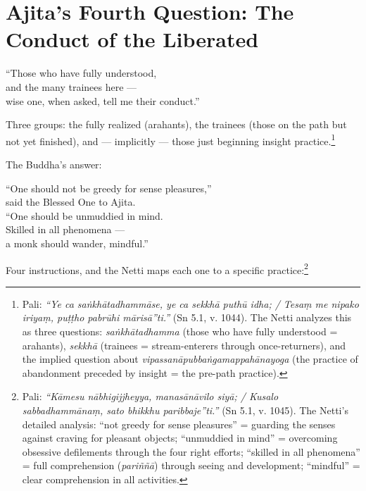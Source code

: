 \section*{Ajita's Fourth Question: The Conduct of the Liberated}

\begin{versebox}
``Those who have fully understood,\\
and the many trainees here ---\\
wise one, when asked, tell me their conduct.''
\end{versebox}

Three groups: the fully realized (arahants), the trainees (those on the path but not yet finished), and --- implicitly --- those just beginning insight practice.\footnote{Pali: \textit{``Ye ca saṅkhātadhammāse, ye ca sekkhā puthū idha; / Tesaṃ me nipako iriyaṃ, puṭṭho pabrūhi mārisā''ti.''} (Sn 5.1, v. 1044). The Netti analyzes this as three questions: \textit{saṅkhātadhamma} (those who have fully understood = arahants), \textit{sekkhā} (trainees = stream-enterers through once-returners), and the implied question about \textit{vipassanāpubbaṅgamappahānayoga} (the practice of abandonment preceded by insight = the pre-path practice).}

The Buddha's answer:

\begin{versebox}
``One should not be greedy for sense pleasures,''\\
said the Blessed One to Ajita.\\
``One should be unmuddied in mind.\\
Skilled in all phenomena ---\\
a monk should wander, mindful.''
\end{versebox}

Four instructions, and the Netti maps each one to a specific practice:\footnote{Pali: \textit{``Kāmesu nābhigijjheyya, manasānāvilo siyā; / Kusalo sabbadhammānaṃ, sato bhikkhu paribbaje''ti.''} (Sn 5.1, v. 1045). The Netti's detailed analysis: ``not greedy for sense pleasures'' = guarding the senses against craving for pleasant objects; ``unmuddied in mind'' = overcoming obsessive defilements through the four right efforts; ``skilled in all phenomena'' = full comprehension (\textit{pariññā}) through seeing and development; ``mindful'' = clear comprehension in all activities.}

